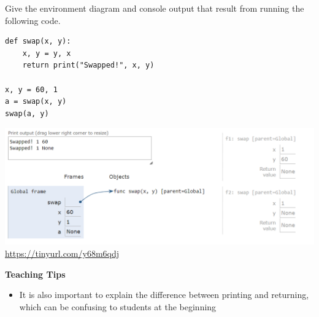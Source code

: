 \begin{blocksection}
\question Give the environment diagram and console output that result from running the following code.

\begin{lstlisting}
def swap(x, y):
    x, y = y, x
    return print("Swapped!", x, y)

x, y = 60, 1
a = swap(x, y)
swap(a, y)
\end{lstlisting}

\begin{solution}[2in]
\includegraphics[scale=0.5]{swap.png}
\\
\url{https://tinyurl.com/y68m6qdj}
\end{solution}
\end{blocksection}

\begin{questionmeta}
\textbf{Teaching Tips}
  \begin{itemize}
    \item It is also important to explain the difference between printing and returning, which can be confusing to students at the beginning
  \end{itemize}
\end{questionmeta}
